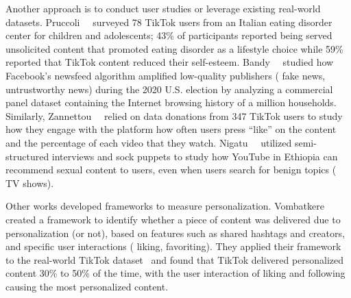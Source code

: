 Another approach is to conduct user studies or leverage existing real-world datasets.
Pruccoli~\etal{}~\cite{Pruccoli2022Dec} surveyed 78 TikTok users from an Italian eating disorder center for children and adolescents; 43\% of participants reported being served unsolicited content that promoted eating disorder as a lifestyle choice while 59\% reported that TikTok content reduced their self-esteem.
Bandy~\etal{}~\cite{BandyFacebook} studied how Facebook's newsfeed algorithm amplified low-quality publishers (\eg{} fake news, untrustworthy news) during the 2020 U.S. election by analyzing a commercial panel dataset containing the Internet browsing history of a million households. 
Similarly, Zannettou~\etal{}~\cite{zannettou2023datadonations} relied on data donations from 347 TikTok users to study how they engage with the platform \eg{} how often users press ``like'' on the content and the percentage of each video that they watch. 
Nigatu~\etal{}~\cite{NigatuYoutube} utilized semi-structured interviews and sock puppets to study how YouTube in Ethiopia can recommend sexual content to users, even when users search for benign topics (\eg{} TV shows). 

Other works developed frameworks to measure personalization. Vombatkere~\etal{}~\cite{VombatkereTikTokFramework} created a framework to identify whether a piece of content was delivered due to personalization (or not), based on features such as shared hashtags and creators, and specific user interactions (\eg{} liking, favoriting). They applied their framework to the real-world TikTok dataset~\cite{zannettou2023datadonations} and found that TikTok delivered personalized content 30\% to 50\% of the time, with the user interaction of liking and following causing the most personalized content. 

